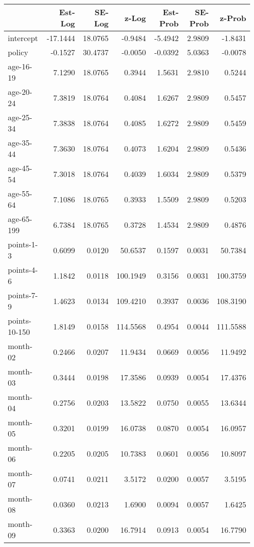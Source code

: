 \documentclass[10pt]{article}
\begin{document}
\begin{table}[ht]
\centering
\begin{tabular}{lrrrrrr}
  \hline
 & Est-Log & SE-Log & z-Log & Est-Prob & SE-Prob & z-Prob \\ 
  \hline
intercept & -17.1444 & 18.0765 & -0.9484 & -5.4942 & 2.9809 & -1.8431 \\ 
  policy & -0.1527 & 30.4737 & -0.0050 & -0.0392 & 5.0363 & -0.0078 \\ 
  age-16-19 & 7.1290 & 18.0765 & 0.3944 & 1.5631 & 2.9810 & 0.5244 \\ 
  age-20-24 & 7.3819 & 18.0764 & 0.4084 & 1.6267 & 2.9809 & 0.5457 \\ 
  age-25-34 & 7.3838 & 18.0764 & 0.4085 & 1.6272 & 2.9809 & 0.5459 \\ 
  age-35-44 & 7.3630 & 18.0764 & 0.4073 & 1.6204 & 2.9809 & 0.5436 \\ 
  age-45-54 & 7.3018 & 18.0764 & 0.4039 & 1.6034 & 2.9809 & 0.5379 \\ 
  age-55-64 & 7.1086 & 18.0765 & 0.3933 & 1.5509 & 2.9809 & 0.5203 \\ 
  age-65-199 & 6.7384 & 18.0765 & 0.3728 & 1.4534 & 2.9809 & 0.4876 \\ 
  points-1-3 & 0.6099 & 0.0120 & 50.6537 & 0.1597 & 0.0031 & 50.7384 \\ 
  points-4-6 & 1.1842 & 0.0118 & 100.1949 & 0.3156 & 0.0031 & 100.3759 \\ 
  points-7-9 & 1.4623 & 0.0134 & 109.4210 & 0.3937 & 0.0036 & 108.3190 \\ 
  points-10-150 & 1.8149 & 0.0158 & 114.5568 & 0.4954 & 0.0044 & 111.5588 \\ 
  month-02 & 0.2466 & 0.0207 & 11.9434 & 0.0669 & 0.0056 & 11.9492 \\ 
  month-03 & 0.3444 & 0.0198 & 17.3586 & 0.0939 & 0.0054 & 17.4376 \\ 
  month-04 & 0.2756 & 0.0203 & 13.5822 & 0.0750 & 0.0055 & 13.6344 \\ 
  month-05 & 0.3201 & 0.0199 & 16.0738 & 0.0870 & 0.0054 & 16.0957 \\ 
  month-06 & 0.2205 & 0.0205 & 10.7383 & 0.0601 & 0.0056 & 10.8097 \\ 
  month-07 & 0.0741 & 0.0211 & 3.5172 & 0.0200 & 0.0057 & 3.5195 \\ 
  month-08 & 0.0360 & 0.0213 & 1.6900 & 0.0094 & 0.0057 & 1.6425 \\ 
  month-09 & 0.3363 & 0.0200 & 16.7914 & 0.0913 & 0.0054 & 16.7790 \\ 

\end{tabular}
\end{table}
\end{document}
